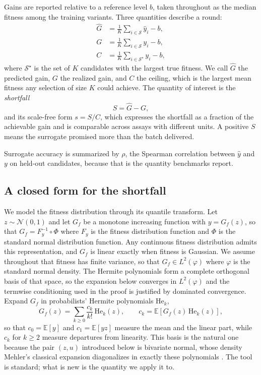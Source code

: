 \documentclass{article}
\theoremstyle{plain}
\theoremstyle{definition}
\newcommand{\yhat}{\hat{y}}
\newcommand{\Exp}{\mathbb{E}}
\newcommand{\He}{\mathrm{He}}
\newcommand{\Normal}{\mathcal{N}}
\begin{document}
Gains are reported relative to a reference level $b$, taken throughout as the median
fitness among the training variants. Three quantities describe a round:
\begin{align}
\hat{G} &= \tfrac{1}{K}\textstyle\sum_{i \in \mathcal{S}} \yhat_i - b,
  \label{eq:predgain}\\
G &= \tfrac{1}{K}\textstyle\sum_{i \in \mathcal{S}} y_i - b,
  \label{eq:realgain}\\
C &= \tfrac{1}{K}\textstyle\sum_{i \in \mathcal{S}^\star} y_i - b,
  \label{eq:ceiling}
\end{align}
where $\mathcal{S}^\star$ is the set of $K$ candidates with the largest true fitness.
We call $\hat{G}$ the predicted gain, $G$ the realized gain, and $C$ the ceiling, which
is the largest mean fitness any selection of size $K$ could achieve. The quantity of
interest is the \emph{shortfall}
\begin{equation}
S = \hat{G} - G,
\label{eq:shortfall}
\end{equation}
and its scale-free form $s = S/C$, which expresses the shortfall as a fraction of the
achievable gain and is comparable across assays with different units. A positive $S$
means the surrogate promised more than the batch delivered.

Surrogate accuracy is summarized by $\rho$, the Spearman correlation between $\yhat$
and $y$ on held-out candidates, because that is the quantity benchmarks report.

\subsection{A closed form for the shortfall}
\label{sec:theory}

We model the fitness distribution through its quantile transform. Let $z \sim
\Normal(0,1)$ and let $G_{\!f}$ be a monotone increasing function with $y = G_{\!f}(z)$,
so that $G_{\!f} = F_y^{-1} \circ \Phi$ where $F_y$ is the fitness distribution function
and $\Phi$ is the standard normal distribution function. Any continuous fitness
distribution admits this representation, and $G_{\!f}$ is linear exactly when fitness is
Gaussian. We assume throughout that fitness has finite variance, so that $G_{\!f} \in
L^2(\varphi)$ where $\varphi$ is the standard normal density. The Hermite polynomials
form a complete orthogonal basis of that space, so the expansion below converges in
$L^2(\varphi)$ and the termwise conditioning used in the proof is justified by
dominated convergence. Expand $G_{\!f}$ in probabilists' Hermite polynomials $\He_k$,
\begin{equation}
G_{\!f}(z) = \sum_{k \ge 0} \frac{c_k}{k!}\, \He_k(z),
\qquad c_k = \Exp\!\left[G_{\!f}(z)\,\He_k(z)\right],
\label{eq:hermite}
\end{equation}
so that $c_0 = \Exp[y]$ and $c_1 = \Exp[y z]$ measure the mean and the linear part,
while $c_k$ for $k \ge 2$ measure departures from linearity. This basis is the natural
one because the pair $(z, u)$ introduced below is bivariate normal, whose density
Mehler's classical expansion diagonalizes in exactly these polynomials
\citep{mehler1866ueber}. The tool is standard; what is new is the quantity we apply it
to.
\end{document}
